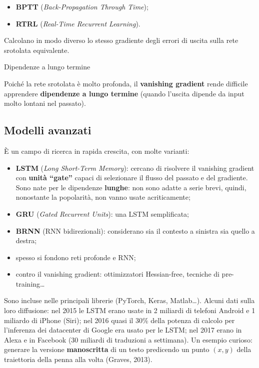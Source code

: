 \begin{itemize}
\tightlist
\item
  \textbf{BPTT} (\emph{Back-Propagation Through Time});
\item
  \textbf{RTRL} (\emph{Real-Time Recurrent Learning}).
\end{itemize}

Calcolano in modo diverso lo stesso gradiente degli errori di uscita
sulla rete srotolata equivalente.

\begin{boxwarning}{Dipendenze a lungo termine}

Poiché la rete srotolata è molto profonda, il \textbf{vanishing
gradient} rende difficile apprendere \textbf{dipendenze a lungo termine}
(quando l'uscita dipende da input molto lontani nel passato).

\end{boxwarning}

\subsection{Modelli avanzati}\label{modelli-avanzati}

È un campo di ricerca in rapida crescita, con molte varianti:

\begin{itemize}
\tightlist
\item
  \textbf{LSTM} (\emph{Long Short-Term Memory}): cercano di risolvere il
  vanishing gradient con \textbf{unità ``gate''} capaci di selezionare
  il flusso del passato e del gradiente. Sono nate per le dipendenze
  \textbf{lunghe}: non sono adatte a serie brevi, quindi, nonostante la
  popolarità, non vanno usate acriticamente;
\item
  \textbf{GRU} (\emph{Gated Recurrent Units}): una LSTM semplificata;
\item
  \textbf{BRNN} (RNN bidirezionali): considerano sia il contesto a
  sinistra sia quello a destra;
\item
  spesso si fondono reti profonde e RNN;
\item
  contro il vanishing gradient: ottimizzatori Hessian-free, tecniche di
  pre-training\ldots{}
\end{itemize}

Sono incluse nelle principali librerie (PyTorch, Keras, Matlab\ldots).
Alcuni dati sulla loro diffusione: nel 2015 le LSTM erano usate in 2
miliardi di telefoni Android e 1 miliardo di iPhone (Siri); nel 2016
quasi il 30\% della potenza di calcolo per l'inferenza dei datacenter di
Google era usato per le LSTM; nel 2017 erano in Alexa e in Facebook (30
miliardi di traduzioni a settimana). Un esempio curioso: generare la
versione \textbf{manoscritta} di un testo predicendo un punto \((x,y)\)
della traiettoria della penna alla volta (Graves, 2013).

